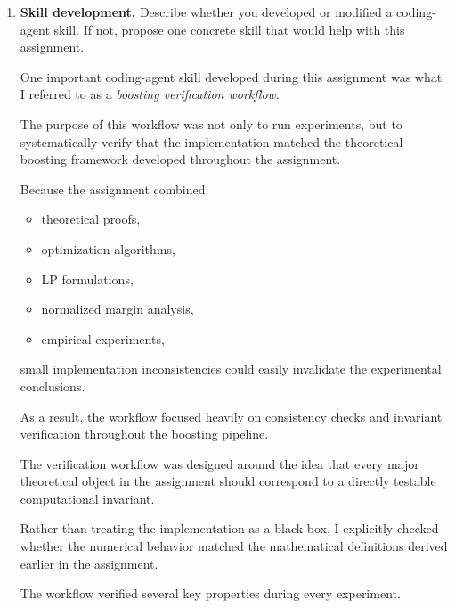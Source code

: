 \documentclass[11pt]{article}
\begin{document}
\begin{enumerate}
\begin{solutionbox}
Using this structured workflow helped maintain consistency between:
\begin{itemize}
    \item the theoretical derivations,
    \item the Lean formalizations,
    \item the experimental implementations.
\end{itemize}

\end{solutionbox}

\item \textbf{Skill development.}
Describe whether you developed or modified a coding-agent skill. If not, propose one 
concrete skill that would help with this assignment.
\begin{solutionbox}
One important coding-agent skill developed during this assignment was what I referred to as a \emph{boosting verification workflow}.

The purpose of this workflow was not only to run experiments, but to systematically verify that the implementation matched the theoretical boosting framework developed throughout the assignment.

Because the assignment combined:
\begin{itemize}
    \item theoretical proofs,
    \item optimization algorithms,
    \item LP formulations,
    \item normalized margin analysis,
    \item empirical experiments,
\end{itemize}
small implementation inconsistencies could easily invalidate the experimental conclusions.

As a result, the workflow focused heavily on consistency checks and invariant verification throughout the boosting pipeline.

\medskip

The verification workflow was designed around the idea that every major theoretical object in the assignment should correspond to a directly testable computational invariant.

Rather than treating the implementation as a black box, I explicitly checked whether the numerical behavior matched the mathematical definitions derived earlier in the assignment.

\medskip

The workflow verified several key properties during every experiment.


\end{solutionbox}
\end{enumerate}
\end{document}
